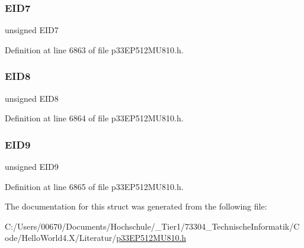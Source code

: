 \subsubsection{\texorpdfstring{E\+I\+D7}{EID7}}
{\footnotesize\ttfamily unsigned E\+I\+D7}



Definition at line 6863 of file p33\+E\+P512\+M\+U810.\+h.

\mbox{\label{structtag_c2_r_x_f11_e_i_d_b_i_t_s_acca25e0b7d86eb499d01f85222baea87}} 
\subsubsection{\texorpdfstring{E\+I\+D8}{EID8}}
{\footnotesize\ttfamily unsigned E\+I\+D8}



Definition at line 6864 of file p33\+E\+P512\+M\+U810.\+h.

\mbox{\label{structtag_c2_r_x_f11_e_i_d_b_i_t_s_ac6748f73d4ada8538b06548be4f396c2}} 
\subsubsection{\texorpdfstring{E\+I\+D9}{EID9}}
{\footnotesize\ttfamily unsigned E\+I\+D9}



Definition at line 6865 of file p33\+E\+P512\+M\+U810.\+h.



The documentation for this struct was generated from the following file\+:\begin{DoxyCompactItemize}
\item 
C\+:/\+Users/00670/\+Documents/\+Hochschule/\+\_\+\+Tier1/73304\+\_\+\+Technische\+Informatik/\+Code/\+Hello\+World4.\+X/\+Literatur/\hyperlink{p33_e_p512_m_u810_8h}{p33\+E\+P512\+M\+U810.\+h}\end{DoxyCompactItemize}
